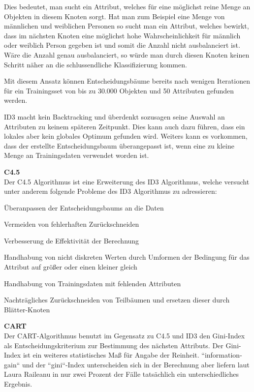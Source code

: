 Dies bedeutet, man sucht ein Attribut, welches für eine möglichst reine Menge an Objekten in diesem Knoten sorgt. Hat man zum Beispiel eine Menge von männlichen und weiblichen Personen so sucht man ein Attribut, welches bewirkt, dass im nächsten Knoten eine möglichst hohe Wahrscheinlichkeit für männlich oder weiblich Person gegeben ist und somit die Anzahl nicht ausbalanciert ist. Wäre die Anzahl genau ausbalanciert, so würde man durch diesen Knoten keinen Schritt näher an die schlussendliche Klassifizierung kommen.

Mit diesem Ansatz können Entscheidungsbäume bereits nach wenigen Iterationen für ein Trainingsset von bis zu 30.000 Objekten und 50 Attributen gefunden werden. \cite{john_ross_quinlan_1986}

ID3 macht kein Backtracking und überdenkt sozusagen seine Auswahl an Attributen zu keinem späteren Zeitpunkt. Dies kann auch dazu führen, dass ein lokales aber kein globales Optimum gefunden wird. \cite{howard_hamilton_machine_2009} Weiters kann es vorkommen, dass der erstellte Entscheidungsbaum überangepasst ist, wenn eine zu kleine Menge an Trainingsdaten verwendet worden ist. \cite{rapidminer_rapidminer_2015}

\textbf{C4.5} \\
Der C4.5 Algorithmus ist eine Erweiterung des ID3 Algorithmus, welche versucht unter anderem folgende Probleme des ID3 Algorithmus zu adressieren:  \cite{howard_hamilton_machine_2009}

\begin{pitemize}
\item Überanpassen der Entscheidungsbaums an die Daten
\item Vermeiden von fehlerhaften Zurückschneiden
\item Verbesserung de Effektivität der Berechnung
\item Handhabung von nicht diskreten Werten durch Umformen der Bedingung für das Attribut auf  größer oder einen kleiner gleich
\item Handhabung von Trainingsdaten mit fehlenden Attributen
\item Nachträgliches Zurückschneiden von Teilbäumen und ersetzen dieser durch Blätter-Knoten
\end{pitemize}

\textbf{CART} \\
Der CART-Algorithmus benutzt im Gegensatz zu C4.5 und ID3 den Gini-Index als Entscheidungskriterium zur Bestimmung des nächsten Attributs. \cite{rapidminer_rapidminer_2015} Der Gini-Index ist ein weiteres statistisches Maß für Angabe der Reinheit. ``information-gain`` und der ``gini``-Index unterscheiden sich in der Berechnung aber liefern laut Laura Raileanu in nur zwei Prozent der Fälle tatsächlich ein unterschiedliches Ergebnis.  \cite{laura_raileanu_2004}

